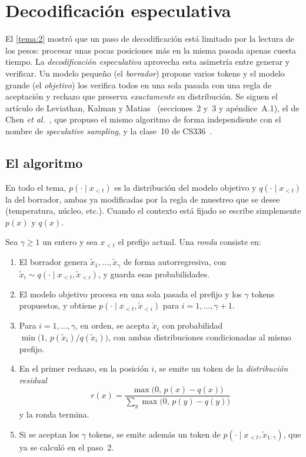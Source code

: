 \chapter{Decodificación especulativa}
\label{tema:3}

El \cref{tema:2} mostró que un paso de decodificación está limitado por la lectura de los pesos: procesar unas pocas posiciones más en la misma pasada apenas cuesta tiempo. La \emph{decodificación especulativa} aprovecha esta asimetría entre generar y verificar. Un modelo pequeño (el \emph{borrador}) propone varios tokens y el modelo grande (el \emph{objetivo}) los verifica todos en una sola pasada con una regla de aceptación y rechazo que preserva \emph{exactamente} su distribución. Se siguen el artículo de Leviathan, Kalman y Matias~\cite{leviathan} (secciones~2 y~3 y apéndice~A.1), el de Chen \emph{et al.}~\cite{chen}, que propuso el mismo algoritmo de forma independiente con el nombre de \emph{speculative sampling}, y la clase~10 de CS336~\cite{cs336}.

\section{El algoritmo}

En todo el tema, $p(\cdot\mid x_{<t})$ es la distribución del modelo objetivo y $q(\cdot\mid x_{<t})$ la del borrador, ambas ya modificadas por la regla de muestreo que se desee (temperatura, núcleo, etc.). Cuando el contexto está fijado se escribe simplemente $p(x)$ y $q(x)$.

\begin{definicion}\label{def:ronda}
Sea $\gamma\ge 1$ un entero y sea $x_{<t}$ el prefijo actual. Una \emph{ronda} consiste en:
\begin{enumerate}[label=\arabic*.]
  \item El borrador genera $\tilde x_1,\dots,\tilde x_\gamma$ de forma autorregresiva, con $\tilde x_i\sim q(\cdot\mid x_{<t},\tilde x_{<i})$, y guarda esas probabilidades.
  \item El modelo objetivo procesa en una sola pasada el prefijo y los $\gamma$ tokens propuestos, y obtiene $p(\cdot\mid x_{<t},\tilde x_{<i})$ para $i=1,\dots,\gamma+1$.
  \item Para $i=1,\dots,\gamma$, en orden, se acepta $\tilde x_i$ con probabilidad $\min\bigl(1,\,p(\tilde x_i)/q(\tilde x_i)\bigr)$, con ambas distribuciones condicionadas al mismo prefijo.
  \item En el primer rechazo, en la posición $i$, se emite un token de la \emph{distribución residual}
  \[
  r(x)=\frac{\max\bigl(0,\,p(x)-q(x)\bigr)}{\sum_{y}\max\bigl(0,\,p(y)-q(y)\bigr)}
  \]
  y la ronda termina.
  \item Si se aceptan los $\gamma$ tokens, se emite además un token de $p(\cdot\mid x_{<t},\tilde x_{1:\gamma})$, que ya se calculó en el paso~2.
\end{enumerate}
\end{definicion}

